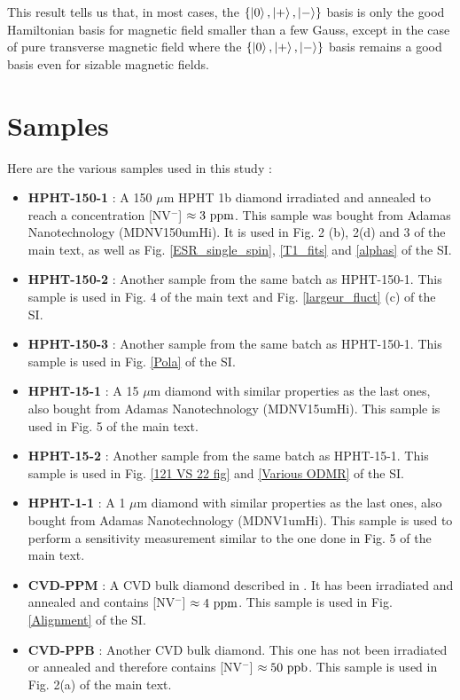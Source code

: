 \documentclass[preprintnumbers,amsmath,amssymb,onecolumn,12pt]{revtex4-2}\usepackage{graphicx}%
\begin{document}
This result tells us that, in most cases, the $\{ \ket{0},\ket{+},\ket{-} \}$ basis is only the good Hamiltonian basis for magnetic field smaller than a few Gauss, except in the case of pure transverse magnetic field where the $\{ \ket{0},\ket{+},\ket{-} \}$ basis remains a good basis even for sizable magnetic fields.


\section{Samples}
Here are the various samples used in this study :
\begin{itemize}
\item \textbf{HPHT-150-1} : A 150 $\mu$m HPHT 1b diamond irradiated and annealed to reach a concentration [NV$^-$] $\approx 3\ \rm ppm$. This sample was bought from Adamas Nanotechnology (MDNV150umHi). It is used in Fig. 2 (b), 2(d) and 3 of the main text, as well as Fig. \ref{ESR_single_spin}, \ref{T1_fits} and \ref{alphas} of the SI.
\item \textbf{HPHT-150-2} : Another sample from the same batch as HPHT-150-1. This sample is used in Fig. 4 of the main text and Fig. \ref{largeur_fluct} (c) of the SI.
\item \textbf{HPHT-150-3} : Another sample from the same batch as HPHT-150-1. This sample is used in Fig. \ref{Pola} of the SI.
\item \textbf{HPHT-15-1}  : A 15 $\mu$m diamond with similar properties as the last ones, also bought from Adamas Nanotechnology (MDNV15umHi). This sample is used in Fig. 5 of the main text.
\item \textbf{HPHT-15-2}  : Another sample from the same batch as HPHT-15-1. This sample is used in Fig. \ref{121 VS 22 fig} and \ref{Various ODMR} of the SI.
\item \textbf{HPHT-1-1}  : A 1 $\mu$m diamond with similar properties as the last ones, also bought from Adamas Nanotechnology (MDNV1umHi). This sample is used to perform a sensitivity measurement similar to the one done in Fig. 5 of the main text.
\item \textbf{CVD-PPM} : A CVD bulk diamond described in \citep{TALLAIRE2020421}. It has been irradiated and annealed and contains [NV$^-$] $\approx 4\ \rm ppm$. This sample is used in Fig. \ref{Alignment} of the SI.
\item \textbf{CVD-PPB} : Another CVD bulk diamond. This one has not been irradiated or annealed and therefore contains [NV$^-$] $\approx 50\ \rm ppb$. This sample is used in Fig. 2(a) of the main text.


\end{itemize}
\end{document}
